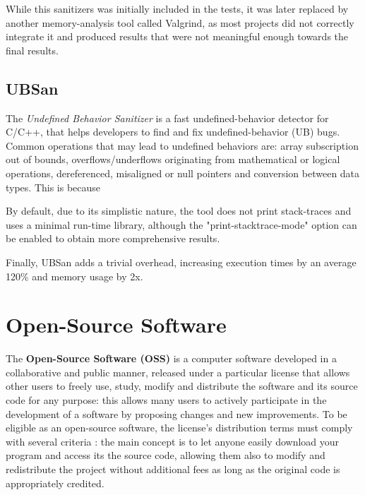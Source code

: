 
While this sanitizers was initially included in the tests, it was later replaced by another memory-analysis tool called Valgrind, as most projects did not correctly integrate it and produced results that were not meaningful enough towards the final results.

\subsection{UBSan}


The \textit{Undefined Behavior Sanitizer} \cite{ubsan_docs} is a fast undefined-behavior detector for C/C++, that helps developers to find and fix undefined-behavior (UB) bugs. Common operations that may lead to undefined behaviors are: array subscription out of bounds, overflows/underflows originating from mathematical or logical operations, dereferenced, misaligned or null pointers and conversion between data types. This is because 

By default, due to its simplistic nature, the tool does not print stack-traces and uses a minimal run-time library, although the "print-stacktrace-mode" option can be enabled to obtain more comprehensive results.


Finally, UBSan adds a trivial overhead, increasing execution times by an average 120\% and memory usage by 2x.



\newpage
\section{Open-Source Software}
The \textbf{Open-Source Software (OSS)} is a computer software developed in a collaborative and public manner, released under a particular license that allows other users to freely use, study, modify and distribute the software and its source code for any purpose: this allows many users to actively participate in the development of a software by proposing changes and new improvements.
To be eligible as an open-source software, the license's distribution terms must comply with several criteria \cite{osd}: the main concept is to let anyone easily download your program and access its the source code, allowing them also to modify and redistribute the project without additional fees as long as the original code is appropriately credited. 

